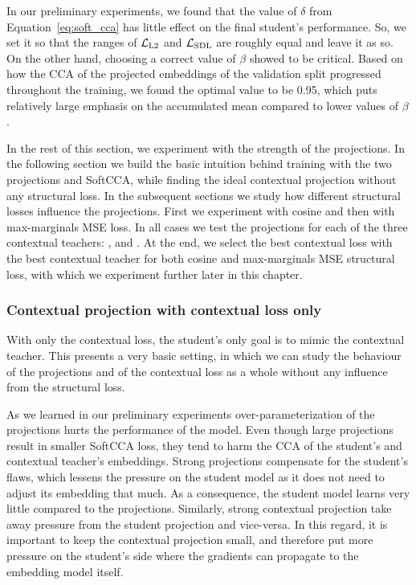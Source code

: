 In our preliminary experiments, we found that the value of $\delta$ from
Equation~\ref{eq:soft_cca} has little effect on the final student's
performance. So, we set it so that the ranges of $\mathcal{L}_{\text{L2}}$ and
$\mathcal{L}_{\text{SDL}}$ are roughly equal and leave it as so. On the other hand,
choosing a correct value of $\beta$ showed to be critical. Based on how the CCA
of the projected embeddings of the validation split progressed throughout the
training, we found the optimal value to be 0.95, which puts relatively large
emphasis on the accumulated mean compared to lower values of $\beta$.

In the rest of this section, we experiment with the strength of the
projections. In the following section we build the basic intuition behind
training with the two projections and SoftCCA, while finding the ideal
contextual projection without any structural loss. In the subsequent sections
we study how different structural losses influence the projections. First we
experiment with cosine and then with max-marginals MSE loss. In all cases we
test the projections for each of the three contextual teachers:
,  and . At the end, we select
the best contextual loss with the best contextual teacher for both cosine and
max-marginals MSE structural loss, with which we experiment further later in
this chapter.

\subsubsection{Contextual projection with contextual loss
only}\label{section:projections_only_contextual}

With only the contextual loss, the student's only goal is to mimic the
contextual teacher. This presents a very basic setting, in which we can study
the behaviour of the projections and of the contextual loss as a whole without
any influence from the structural loss.

As we learned in our preliminary experiments over-parameterization of the
projections hurts the performance of the model. Even though large projections
result in smaller SoftCCA loss, they tend to harm the CCA of the student's and
contextual teacher's embeddings. Strong projections compensate for the
student's flaws, which lessens the pressure on the student model as it does not
need to adjust its embedding that much. As a consequence, the student model
learns very little compared to the projections. Similarly, strong contextual
projection take away pressure from the student projection and vice-versa. In
this regard, it is important to keep the contextual projection small, and
therefore put more pressure on the student's side where the gradients can
propagate to the embedding model itself.

